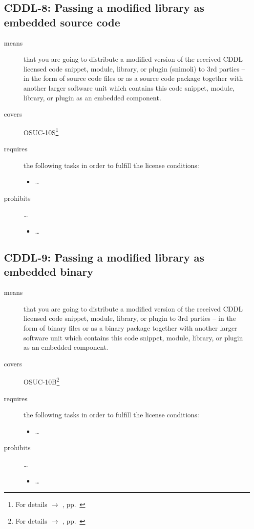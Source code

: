 \subsection{CDDL-8: Passing a modified library as embedded source code}
\label{OSUC-10S-CDDL}

\begin{description}
\item[means] that you are going to distribute a modified version of the received
CDDL licensed code snippet, module, library, or plugin (snimoli) to 3rd parties
-- in the form of source code files or as a source code package together with
another larger software unit which contains this code snippet, module, library,
or plugin as an embedded component.
\item[covers] OSUC-10S\footnote{For details $\rightarrow$ \oslic, pp.\
\pageref{OSUC-10S-DEF}}
\item[requires] the following tasks in order to fulfill the license conditions:
\begin{itemize}
  
  \item \ldots
  
\end{itemize}

\item[prohibits] \ldots
\begin{itemize}
  \item \ldots
\end{itemize}
\end{description}

\subsection{CDDL-9: Passing a modified library as embedded binary}
\label{OSUC-10B-CDDL}

\begin{description}
\item[means] that you are going to distribute a modified version of the received
CDDL licensed code snippet, module, library, or plugin to 3rd parties -- in the
form of binary files or as a binary package together with another larger
software unit which contains this code snippet, module, library, or plugin as an
embedded component.
\item[covers] OSUC-10B\footnote{For details $\rightarrow$ \oslic, pp.\
\pageref{OSUC-10B-DEF}}
\item[requires] the following tasks in order to fulfill the license conditions:
\begin{itemize}
  
  \item \ldots
  
\end{itemize}

\item[prohibits] \ldots
\begin{itemize}
  \item \ldots
\end{itemize}
\end{description}

